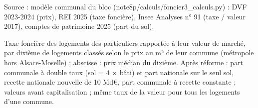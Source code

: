 Source : modèle communal du bloc (note8p/calculs/foncier3\_calculs.py) : DVF 2023-2024 (prix), REI 2025 (taxe foncière), Insee Analyses n° 91 (taxe / valeur 2017), comptes de patrimoine 2025 (part du sol).\par Taxe foncière des logements des particuliers rapportée à leur valeur de marché, par dixième de logements classés selon le prix au m² de leur commune (métropole hors Alsace-Moselle) ; abscisse : prix médian du dixième. Après réforme : part communale à double taux (sol = 4 × bâti) et part nationale sur le seul sol, recette nationale nouvelle de 10 Md€, part communale à recette constante ; valeurs avant capitalisation ; même taux de la valeur pour tous les logements d'une commune.
